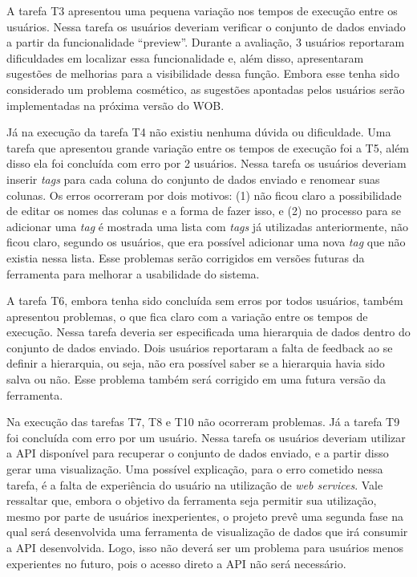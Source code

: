 A tarefa T3 apresentou uma pequena variação nos tempos de execução entre os usuários. 
Nessa tarefa os usuários deveriam verificar o conjunto de dados enviado a partir da 
funcionalidade “preview”. Durante a avaliação, 3 usuários reportaram dificuldades em 
localizar essa funcionalidade e, além disso, apresentaram sugestões de melhorias para 
a visibilidade dessa função. Embora esse tenha sido considerado um problema cosmético, 
as sugestões apontadas pelos usuários serão implementadas na próxima versão do WOB.

Já na execução da tarefa T4 não existiu nenhuma dúvida ou dificuldade. Uma tarefa que 
apresentou grande variação entre os tempos de execução foi a T5, além disso ela foi 
concluída com erro por 2 usuários. Nessa tarefa os usuários deveriam inserir \textit{tags} para 
cada coluna do conjunto de dados enviado e renomear suas colunas. Os erros ocorreram por 
dois motivos: (1) não ficou claro a possibilidade de editar os nomes das colunas e a 
forma de fazer isso, e (2) no processo para se adicionar uma \textit{tag} é mostrada uma lista 
com \textit{tags} já utilizadas anteriormente, não ficou claro, segundo os usuários, que era 
possível adicionar uma nova \textit{tag} que não existia nessa lista. Esse problemas serão 
corrigidos em versões futuras da ferramenta para melhorar a usabilidade do sistema.

A tarefa T6, embora tenha sido concluída sem erros por todos usuários, também apresentou 
problemas, o que fica claro com a variação entre os tempos de execução. Nessa tarefa 
deveria ser especificada uma hierarquia de dados dentro do conjunto de dados enviado. 
Dois usuários reportaram a falta de feedback ao se definir a hierarquia, ou seja, não era 
possível saber se a hierarquia havia sido salva ou não. Esse problema também será corrigido 
em uma futura versão da ferramenta.

Na execução das tarefas T7, T8 e T10 não ocorreram problemas. Já a tarefa T9 foi concluída 
com erro por um usuário. Nessa tarefa os usuários deveriam utilizar a API disponível para 
recuperar o conjunto de dados enviado, e a partir disso gerar uma visualização. Uma possível 
explicação, para o erro cometido nessa tarefa, é a falta de experiência do usuário na 
utilização de \textit{web services}. Vale ressaltar que, embora o objetivo da ferramenta 
seja permitir sua utilização, mesmo por parte de usuários inexperientes, o projeto prevê uma 
segunda fase na qual será desenvolvida uma ferramenta de visualização de dados que irá 
consumir a API desenvolvida. Logo, isso não deverá ser um problema para usuários menos 
experientes no futuro, pois o acesso direto a API não será necessário.

